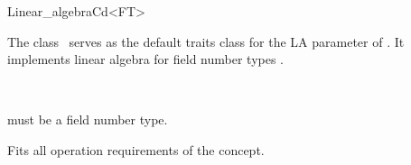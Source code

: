 \ccAutoIndexingOff
\begin{ccRefClass}{Linear_algebraCd<FT>}
\ccAutoIndexingOn
{}

\ccDefinition

The class \ccRefName\ serves as the default traits class for the LA
parameter of .  It implements linear
algebra for field number types .


\ccIsModel

%
 \\


 must be a field number type.

\ccOperations

Fits all operation requirements of the concept.

\ccIndexTraitsClassEnd
\ccAutoIndexingOff
\end{ccRefClass}
\ccAutoIndexingOn     